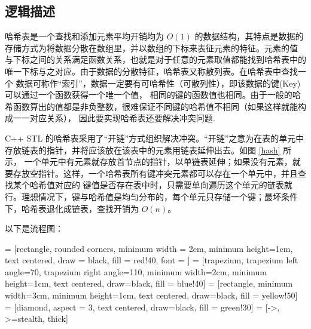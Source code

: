{\subsection{逻辑描述}

哈希表是一个查找和添加元素平均开销均为 $O(1)$ 的数据结构，其特点是数据的存储方式为将数据分散在数组里，并以数组的下标来表征元素的特征。元素的值%
与下标之间的关系满足函数关系，也就是对于任意的元素取值都能找到哈希表中的唯一下标与之对应。由于数据的分散特征，哈希表又称{散列表}。在哈希表中查找一个%
数据可称作“索引”，数据一定要有{\kaishu 可哈希性（可散列性）}，即该数据的{\kaishu 键(Key)}可以通过一个函数获得一个唯一个值，%
相同的键的函数值也相同。由于一般的哈希函数算出的值都是非负整数，很难保证不同键的哈希值不相同（如果这样就能构成一一对应关系），%
因此要实现哈希表还要解决{\kaishu 冲突}问题.

C++ STL 的哈希表采用了“开链”方式组织解决冲突。“开链”之意为在表的单元中存放链表的指针，并将应该放在该表中的元素用链表延伸出去。如图 \ref{hash} 所示，%
一个单元中有元素就存放首节点的指针，以单链表延伸；如果没有元素，就要存放空指针。这样，一个哈希表所有键冲突元素都可以存在一个单元中，并且查找某个哈希值对应的%
键值是否存在表中时，只需要单向遍历这个单元的链表就行。理想情况下，键与哈希值是均匀分布的，每个单元只存储一个键；最坏条件下，哈希表退化成链表，查找开销为 $O(n)$。

以下是流程图：

 = [rectangle, rounded corners, minimum width = 2cm, 
        minimum height=1cm, text centered, draw = black, fill = red!40,
        font = {\bfseries}]
     = [trapezium, trapezium left angle=70, trapezium right angle=110, 
    minimum width=2cm, minimum height=1cm, text centered, draw=black, fill = blue!40]
     = [rectangle, minimum width=3cm, minimum height=1cm, text centered, draw=black, fill = yellow!50]
     = [diamond, aspect = 3, text centered, draw=black, fill = green!30]
     = [->, >=stealth, thick]


{
    \begin{figure}[H]
        \centering
\end{figure}}}
